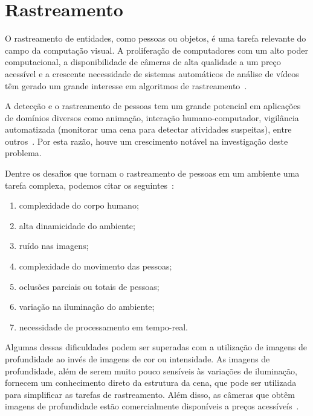 \section {Rastreamento}	
\label{sec:rastreamento}

	O rastreamento de entidades, como pessoas ou objetos, é uma tarefa relevante do campo da computação visual. A proliferação de computadores com um alto poder computacional, a disponibilidade de câmeras de alta qualidade a um preço acessível e a crescente necessidade de sistemas automáticos de análise de vídeos têm gerado um grande interesse em algoritmos de rastreamento~\cite{yilmaz}.


	A detecção e o rastreamento de pessoas tem um grande potencial em aplicações de domínios diversos como animação, interação humano-computador, vigilância automatizada (monitorar uma cena para detectar atividades suspeitas), entre outros~\cite{yilmaz}. Por esta razão, houve um crescimento notável na investigação deste problema.

	Dentre os desafios que tornam o rastreamento de pessoas em um ambiente uma tarefa complexa, podemos citar os seguintes~\cite{yilmaz}:

		\begin{enumerate}
			\item complexidade do corpo humano;
			\item alta dinamicidade do ambiente;
			\item ruído nas imagens;
			\item complexidade do movimento das pessoas;
			\item oclusões parciais ou totais de pessoas;
			\item variação na iluminação do ambiente;
			\item necessidade de processamento em tempo-real.
		\end{enumerate}

	Algumas dessas dificuldades podem ser superadas com a utilização de imagens de profundidade ao invés de imagens de cor ou intensidade. As imagens de profundidade, além de serem muito pouco sensíveis às variações de iluminação, fornecem um conhecimento direto da estrutura da cena, que pode ser utilizada para simplificar as tarefas de rastreamento. Além disso, as câmeras que obtêm imagens de profundidade estão comercialmente disponíveis a preços acessíveís~\cite{nikos}.

